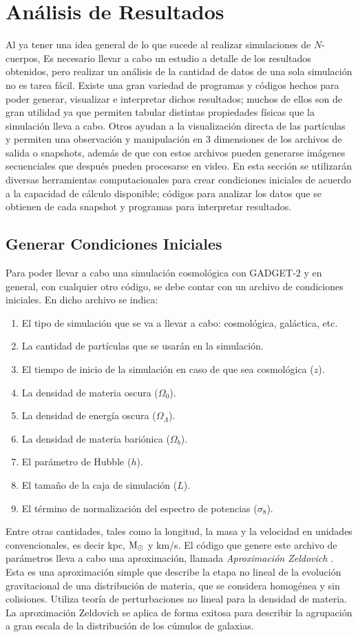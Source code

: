 \documentclass[a4paper,openright,12pt]{book}
\begin{document}
\chapter{Análisis de Resultados}
Al ya tener una idea general de lo que sucede al realizar simulaciones de $N$-cuerpos, Es necesario llevar a cabo un estudio a detalle de los resultados obtenidos, pero realizar un análisis de la cantidad de datos de una sola simulación no es tarea fácil. Existe una gran variedad de programas y códigos hechos para poder generar, visualizar e interpretar dichos resultados; muchos de ellos son de gran utilidad ya que permiten tabular distintas propiedades físicas que la simulación lleva a cabo. Otros ayudan a la visualización directa de las partículas y permiten una observación  y manipulación en 3 dimensiones de los archivos de salida o \textsf{snapshots}, además de que con estos archivos pueden generarse imágenes secuenciales que después pueden procesarse en video. En esta sección se utilizarán diversas herramientas computacionales para crear condiciones iniciales de acuerdo a la capacidad de cálculo disponible; códigos para analizar los datos que se obtienen de cada \textsf{snapshot} y programas para interpretar resultados.

\section{Generar Condiciones Iniciales}
Para poder llevar a cabo una simulación cosmológica con GADGET-2 y en general, con cualquier otro código, se debe contar con un archivo de condiciones iniciales. En dicho archivo se indica:
\begin{enumerate}
\item El tipo de simulación que se va a llevar a cabo: cosmológica, galáctica, etc.
\item La cantidad de partículas que se usarán en la simulación.
\item El tiempo de inicio de la simulación en caso de que sea cosmológica ($z$).
\item La densidad de materia oscura ($\Omega_{0}$).
\item La densidad de energía oscura ($\Omega_{\Lambda}$).
\item La densidad de materia bariónica ($\Omega_{b}$).
\item El parámetro de Hubble ($h$).
\item El tamaño de la caja de simulación ($L$).
\item El término de normalización del espectro de potencias ($\sigma_{8}$).
\end{enumerate}
Entre otras cantidades, tales como la longitud, la masa y la velocidad en unidades convencionales, es decir kpc, $\textup M_{\odot}$ y km/s. El código que genere este archivo de parámetros lleva a cabo una aproximación, llamada \textit{Aproximación Zeldovich} \cite{4.1, 4.2}. Esta es una aproximación simple que describe la etapa no lineal de la evolución gravitacional de una distribución de materia, que se considera homogénea y sin colisiones. Utiliza teoría de perturbaciones no lineal para la densidad de materia. La aproximación Zeldovich se aplica de forma exitosa para describir la agrupación a gran escala de la distribución de los cúmulos de galaxias.
\end{document}
